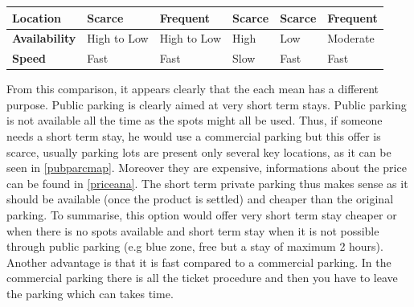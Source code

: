 \documentclass[12pt,a4paper,oneside]{book}
\newcommand\T{\rule{0pt}{2.6ex}}       %
\newcommand\B{\rule[-1.2ex]{0pt}{0pt}} %
\begin{document}
\begin{table}[h]
\begin{adjustbox}{center}
\begin{tabular}{l|l|l|l|l|l|}
\multicolumn{1}{|l|}{\textbf{Location}\T\B}     & Scarce                             & Frequent                                                     & Scarce                                                                                                      & Scarce                                                                                                             & Frequent                                                                                                            \\ \hline
\multicolumn{1}{|l|}{\textbf{Availability}\T\B} & High to Low                        & High to Low                                                  & High                                                                                                        & Low                                                                                                                & Moderate                                                                                                            \\ \hline
\multicolumn{1}{|l|}{\textbf{Speed}\T\B}        & Fast                               & Fast                                                         & Slow                                                                                                        & Fast                                                                                                               & Fast                                                                                                                \\ \hline
\end{tabular}
\end{adjustbox}
\end{table}

From this comparison, it appears clearly that the each mean has a different purpose. Public parking is clearly aimed at very short term stays. Public parking is not available all the time as the spots might all be used. Thus, if someone needs a short term stay, he would use a commercial parking but this offer is scarce, usually parking lots are present only several key locations, as it can be seen in \autoref{pubparcmap}. Moreover they are expensive, informations about the price can be found in \autoref{priceana}. The short term private parking thus makes sense as it should be available (once the product is settled) and cheaper than the original parking. To summarise, this option would offer very short term stay cheaper or when there is no spots available and short term stay when it is not possible through public parking (e.g blue zone, free but a stay of maximum 2 hours). Another advantage is that it is fast compared to a commercial parking. In the commercial parking there is all the ticket procedure and then you have to leave the parking which can takes time.\\
\end{document}
